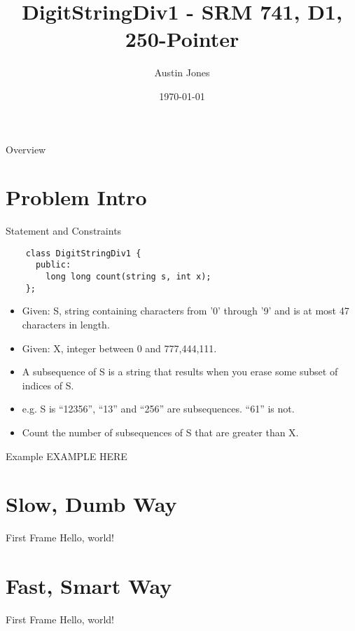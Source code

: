 \documentclass[10pt]{beamer}
\author{Austin Jones}
\title{DigitStringDiv1 \-- SRM 741, D1, 250-Pointer}
\date{\today}
\institute{University of Tennessee \-- Knoxville}
\begin{document}
\maketitle

\begin{frame}{Overview}
  \large
  \tableofcontents[hideallsubsections]
\end{frame}

\section{Problem Intro}

\begin{frame}[fragile]{Statement and Constraints}
  \begin{verbatim}
    class DigitStringDiv1 {
      public:
        long long count(string s, int x);
    };
  \end{verbatim}
  \begin{itemize}
    \item Given: S, string containing characters from '0' through '9' and is at most 47 characters in length.
    \item Given: X, integer between 0 and 777,444,111.
    \item A subsequence of S is a string that results when you erase some subset of indices of S.
    \item e.g. S is ``12356'', ``13'' and ``256'' are subsequences. ``61'' is not.
    \item Count the number of subsequences of S that are greater than X.
  \end{itemize}
\end{frame}

\begin{frame}{Example}
  EXAMPLE HERE
\end{frame}

\section{Slow, Dumb Way}

\begin{frame}{First Frame}
  Hello, world!
\end{frame}

\section{Fast, Smart Way}

\begin{frame}{First Frame}
  Hello, world!
\end{frame}
\end{document}
